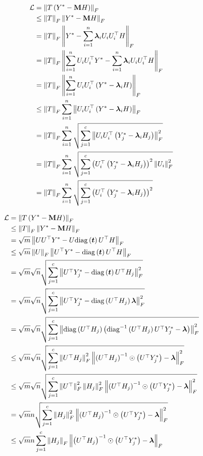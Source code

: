 \documentclass{article} %
\def\vlambda{{\bm\lambda}}
\begin{document}
\begin{equation}
	\begin{aligned}
		\gL&=\left\|T\left(Y^*-\rmM H\right)\right\|_F\\
		&\leq\left\|T\right\|_F\left\|Y^*-\rmM H\right\|_F\\
		&=\left\|T\right\|_F\left\|Y^*-\sum_{i=1}^n\vlambda_iU_iU_i^{\top}H\right\|_F\\
		&=\left\|T\right\|_F\left\|\sum_{i=1}^nU_iU_i^{\top}Y^*-\sum_{i=1}^n\vlambda_iU_iU_i^{\top}H\right\|_F\\
		&=\left\|T\right\|_F\left\|\sum_{i=1}^nU_iU_i^{\top}\left(Y^*-\vlambda_iH\right)\right\|_F\\
		&\leq\left\|T\right\|_F\sum_{i=1}^n\left\|U_iU_i^{\top}\left(Y^*-\vlambda_iH\right)\right\|_F\\
		&=\left\|T\right\|_F\sum_{i=1}^n\sqrt{\sum_{j=1}^c\left\|U_iU_i^{\top}\left(Y^*_j-\vlambda_iH_j\right)\right\|^2_F}\\
		&=\left\|T\right\|_F\sum_{i=1}^n\sqrt{\sum_{j=1}^c\left(U_i^{\top}\left(Y^*_j-\vlambda_iH_j\right)\right)^2\left\|U_i\right\|^2_F}\\
		&=\left\|T\right\|_F\sum_{i=1}^n\sqrt{\sum_{j=1}^c\left(U_i^{\top}\left(Y^*_j-\vlambda_iH_j\right)\right)^2}
	\end{aligned}
\end{equation}

\begin{equation}
	\begin{aligned}
		\gL&=\left\|T\left(Y^*-\rmM H\right)\right\|_F\\
		&\leq\left\|T\right\|_F\left\|Y^*-\rmM H\right\|_F\\
		&=\sqrt{m}\left\|UU^{\top}Y^*-U\mathrm{diag}\left(\vt\right)U^{\top}H\right\|_F\\
		&\leq\sqrt{m}\left\|U\right\|_F\left\|U^{\top}Y^*-\mathrm{diag}\left(\vt\right)U^{\top}H\right\|_F\\
		&=\sqrt{m}\sqrt{n}\sqrt{\sum_{j=1}^c\left\|U^{\top}Y^*_j-\mathrm{diag}\left(\vt\right)U^{\top}H_j\right\|^2_F}\\
		&=\sqrt{m}\sqrt{n}\sqrt{\sum_{j=1}^c\left\|U^{\top}Y^*_j-\mathrm{diag}\left(U^{\top}H_j\right)\vlambda\right\|^2_F}\\
		&=\sqrt{m}\sqrt{n}\sqrt{\sum_{j=1}^c\left\|\mathrm{diag}\left(U^{\top}H_j\right)\left(\mathrm{diag}^{-1}\left(U^{\top}H_j\right)U^{\top}Y^*_j-\vlambda\right)\right\|^2_F}\\
		&\leq\sqrt{m}\sqrt{n}\sqrt{\sum_{j=1}^c\left\|U^{\top}H_j\right\|^2_F\left\|\left(U^{\top}H_j\right)^{-1}\odot\left(U^{\top}Y^*_j\right)-\vlambda\right\|^2_F}\\
		&\leq\sqrt{m}\sqrt{n}\sqrt{\sum_{j=1}^c\left\|U^{\top}\right\|^2_F\left\|H_j\right\|^2_F\left\|\left(U^{\top}H_j\right)^{-1}\odot\left(U^{\top}Y^*_j\right)-\vlambda\right\|^2_F}\\
		&=\sqrt{m}n\sqrt{\sum_{j=1}^c\left\|H_j\right\|^2_F\left\|\left(U^{\top}H_j\right)^{-1}\odot\left(U^{\top}Y^*_j\right)-\vlambda\right\|^2_F}\\
		&\leq\sqrt{m}n\sum_{j=1}^c\left\|H_j\right\|_F\left\|\left(U^{\top}H_j\right)^{-1}\odot\left(U^{\top}Y^*_j\right)-\vlambda\right\|_F
	\end{aligned}
\end{equation}
\end{document}
